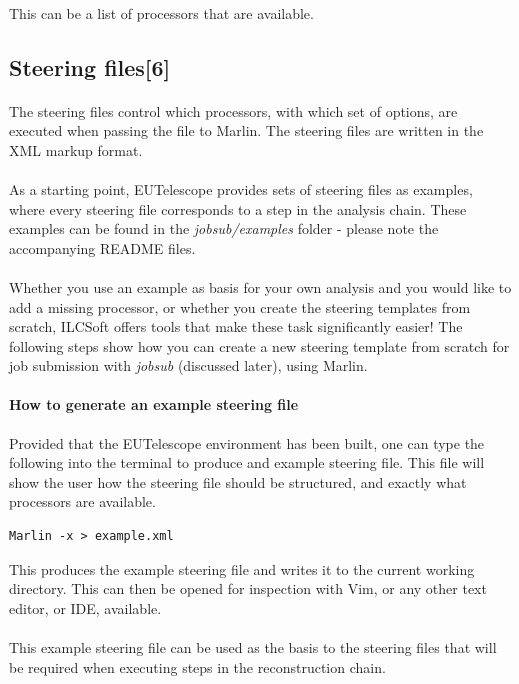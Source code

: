\documentclass[11pt]{article}
\begin{document}
\paragraph{}
This can be a list of processors that are available.
\subsection{Steering files[6]}
\paragraph{}
The steering files control which processors, with which set of options, are executed when passing the file to Marlin. The steering files are written in the XML markup format.
\paragraph{}
As a starting point, EUTelescope provides sets of steering files as examples, where every steering file corresponds to a step in the analysis chain. These examples can be found in the \textit{jobsub/examples} folder - please note the accompanying README files.
\paragraph{}
Whether you use an example as basis for your own analysis and you would like to add a missing processor, or whether you create the steering templates from scratch, ILCSoft offers tools that make these task significantly easier! The following steps show how you can create a new steering template from scratch for job submission with \textit{jobsub} (discussed later), using Marlin. 
\paragraph{How to generate an example steering file}
Provided that the EUTelescope environment has been built, one can type the following into the terminal to produce and example steering file. This file will show the user how the steering file should be structured, and exactly what processors are available.
\begin{verbatim}
Marlin -x > example.xml
\end{verbatim}
This produces the example steering file and writes it to the current working directory. This can then be opened for inspection with Vim, or any other text editor, or IDE, available.
\paragraph{}
This example steering file can be used as the basis to the steering files that will be required when executing steps in the reconstruction chain.
\end{document}
